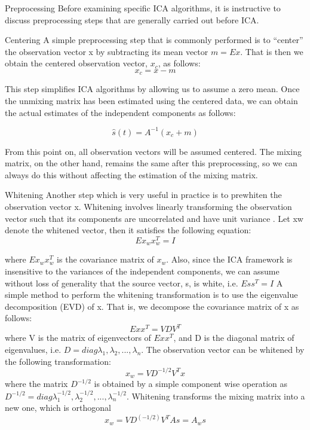 \begin{compactitem}
\item {Preprocessing}
Before examining specific ICA algorithms, it is instructive
to discuss preprocessing steps that are generally carried out
before ICA.

\item {Centering}
A simple preprocessing step that is commonly performed
is to “center” the observation vector x by subtracting its
mean vector $m=E{x}$. That is then we obtain the centered
observation vector, $x_c$, as follows:
\begin{equation}
\label{eq:ica-zero-mean}
x_c = x-m
\end{equation}

This step simplifies ICA algorithms by allowing us to
assume a zero mean. Once the unmixing matrix has been
estimated using the centered data, we can obtain the actual
estimates of the independent components as follows:

\begin{equation}
\label{eq:ica-source}
\hat{s}(t) = A^{-1} (x_c + m )
\end{equation}

From this point on, all observation vectors will be assumed
centered. The mixing matrix, on the other hand,
remains the same after this preprocessing, so we can always
do this without affecting the estimation of the mixing
matrix.

\item {Whitening}
Another step which is very useful in practice is to prewhiten
the observation vector x. Whitening involves linearly
transforming the observation vector such that its components
are uncorrelated and have unit variance . Let
xw denote the whitened vector, then it satisfies the following
equation:
\begin{equation}
\label{eq:ica-source1}
E{x_w x^T_w} = I
\end{equation}

where $E{x_w x^T_w}$ is the covariance matrix of $x_w$. Also,
since the ICA framework is insensitive to the variances
of the independent components, we can assume without
loss of generality that the source vector, s, is white, i.e.
$E{s s^T } = I$
A simple method to perform the whitening transformation
is to use the eigenvalue decomposition (EVD) of x. 
That is, we decompose the covariance matrix of x as follows:
\begin{equation}
\label{eq:ica-evd}
E{x x^T } =VDV^T
\end{equation}
where V is the matrix of eigenvectors of $E{x x^T }$,
and D is the diagonal matrix of eigenvalues, i.e. 
$D = diag{\lambda_1,\lambda_2, ...,\lambda_n}$. The observation vector can be
whitened by the following transformation:
\begin{equation}
\label{eq:ica-whiteningX1}
x_w = VD^{-1/2}V^Tx
\end{equation}
where the matrix $D^{-1/2}$ is obtained by a
simple component wise operation as $D^{-1/2}=diag{\lambda_1^{-1/2},\lambda_2^{-1/2},...,\lambda_n^{-1/2}}$. Whitening transforms
the mixing matrix into a new one, which is orthogonal
\begin{equation}
\label{eq:ica-whiteningX}
x_w=VD^(-1/2)V^TAs=A_w s
\end{equation}


\end{compactitem}
